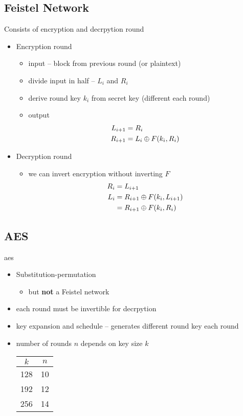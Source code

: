 \documentclass[draft]{article}
\begin{document}
\subsection{Feistel Network}
Consists of encryption and decrpytion round
\begin{itemize}[nosep]
    \item Encryption round
          \begin{itemize}[nosep]
              \item input -- block from previous round (or plaintext)
              \item divide input in half -- $L_i$ and $R_i$
              \item derive round key $k_i$ from secret key (different each round)
              \item output
                    \begin{align*}
                        L_{i+1} & = R_i                  \\
                        R_{i+1} & = L_i \oplus F(k_i, R_i)
                    \end{align*}
          \end{itemize}
    \item Decryption round
          \begin{itemize}[nosep]
              \item we can invert encryption without inverting $F$
                    \begin{align*}
                        R_i & = L_{i + 1}                        \\
                        L_i & = R_{i + 1} \oplus F(k_i, L_{i + 1}) \\
                            & = R_{i + 1} \oplus F(k_i, R_i)
                    \end{align*}
          \end{itemize}
\end{itemize}
\subsection{AES}
\acrfull{aes}
\begin{itemize}[nosep]
    \item Substitution-permutation
          \begin{itemize}[nosep]\item but \textbf{not} a Feistel network\end{itemize}
    \item each round must be invertible for decrpytion
    \item key expansion and schedule -- generates different round key each round
    \item number of rounds $n$ depends on key size $k$

          \begin{tabular}{cc}
              $k$ & $n$ \\\toprule
              128 & 10  \\
              192 & 12  \\
              256 & 14  \\\bottomrule
          \end{tabular}
\end{itemize}
\end{document}
